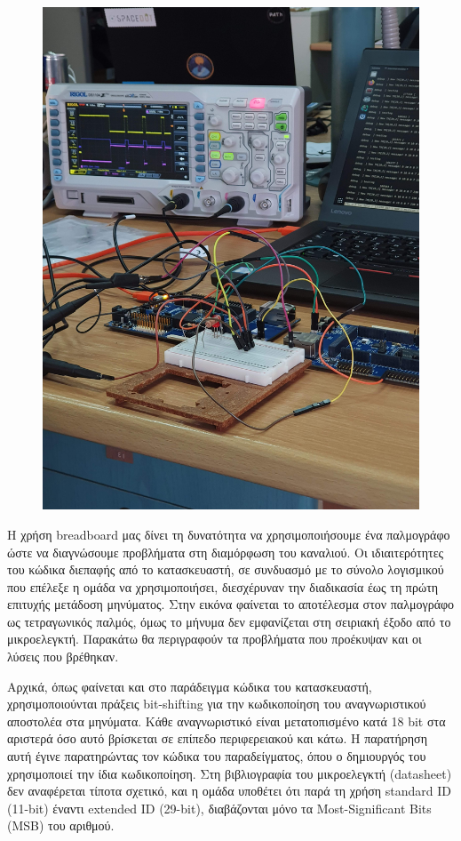 \documentclass[a4paper,nobib,justified]{tufte-book}
\begin{document}
\begin{figure}[ht]
	\includegraphics[angle=270,origin=c]{media/images/lab-wiring-scope.jpg}
	\label{fig:lab-wiring-scope}
\end{figure}

Η χρήση breadboard μας δίνει τη δυνατότητα να χρησιμοποιήσουμε ένα παλμογράφο ώστε να διαγνώσουμε προβλήματα στη διαμόρφωση του καναλιού. Οι ιδιαιτερότητες του κώδικα διεπαφής από το κατασκευαστή, σε συνδυασμό με το σύνολο λογισμικού που επέλεξε η ομάδα να χρησιμοποιήσει, διεσχέρυναν την διαδικασία έως τη πρώτη επιτυχής μετάδοση μηνύματος. Στην εικόνα φαίνεται το αποτέλεσμα στον παλμογράφο ως τετραγωνικός παλμός, όμως το μήνυμα δεν εμφανίζεται στη σειριακή έξοδο από το μικροελεγκτή. Παρακάτω θα περιγραφούν τα προβλήματα που προέκυψαν και οι λύσεις που βρέθηκαν.

Αρχικά, όπως φαίνεται και στο παράδειγμα κώδικα του κατασκευαστή, χρησιμοποιούνται πράξεις bit-shifting για την κωδικοποίηση του αναγνωριστικού αποστολέα στα μηνύματα. Κάθε αναγνωριστικό είναι μετατοπισμένο κατά 18 bit στα αριστερά όσο αυτό βρίσκεται σε επίπεδο περιφερειακού και κάτω. Η παρατήρηση αυτή έγινε παρατηρώντας τον κώδικα του παραδείγματος, όπου ο δημιουργός του χρησιμοποιεί την ίδια κωδικοποίηση. Στη βιβλιογραφία του μικροελεγκτή (datasheet) δεν αναφέρεται τίποτα σχετικό, και η ομάδα υποθέτει ότι παρά τη χρήση standard ID (11-bit) έναντι extended ID (29-bit), διαβάζονται μόνο τα Most-Significant Bits (MSB) του αριθμού.
\end{document}
